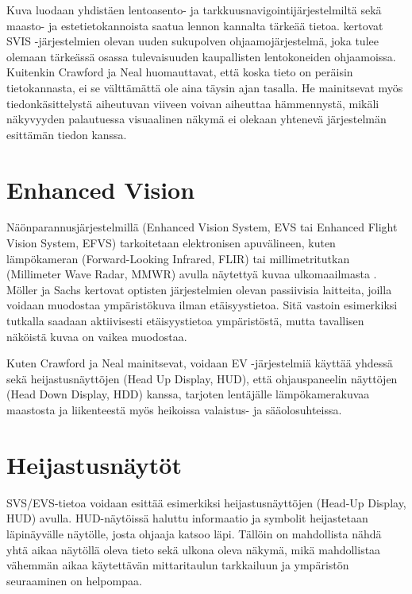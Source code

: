 \documentclass[utf8,bachelor,manualbib]{gradu3}
\begin{document}
Kuva luodaan yhdistäen lentoasento- ja tarkkuusnavigointijärjestelmiltä sekä maasto- ja estetietokannoista saatua lennon kannalta tärkeää tietoa. \cite{schnellym2004} kertovat SVIS -järjestelmien olevan uuden sukupolven ohjaamojärjestelmä, joka tulee olemaan tärkeässä osassa tulevaisuuden kaupallisten lentokoneiden ohjaamoissa. Kuitenkin Crawford ja Neal \citeyearpar{crawfordneal2006} huomauttavat, että koska tieto on peräisin tietokannasta, ei se välttämättä ole aina täysin ajan tasalla. He mainitsevat myös tiedonkäsittelystä aiheutuvan viiveen voivan aiheuttaa hämmennystä, mikäli näkyvyyden palautuessa visuaalinen näkymä ei olekaan yhtenevä järjestelmän esittämän tiedon kanssa.

\section{Enhanced Vision}

Näönparannusjärjestelmillä (Enhanced Vision System, EVS tai Enhanced Flight Vision System, EFVS) tarkoitetaan elektronisen apuvälineen, kuten lämpökameran (Forward-Looking Infrared, FLIR) tai millimetritutkan (Millimeter Wave Radar, MMWR) avulla näytettyä kuvaa ulkomaailmasta \citep{baileyym2007}. Möller ja Sachs \citeyearpar{mollersachs1994} kertovat optisten järjestelmien olevan passiivisia laitteita, joilla voidaan muodostaa ympäristökuva ilman etäisyystietoa. Sitä vastoin esimerkiksi tutkalla saadaan aktiivisesti etäisyystietoa ympäristöstä, mutta tavallisen näköistä kuvaa on vaikea muodostaa.

Kuten Crawford ja Neal \citeyearpar{crawfordneal2006} mainitsevat, voidaan EV -järjestelmiä käyttää yhdessä sekä heijastusnäyttöjen (Head Up Display, HUD), että ohjauspaneelin näyttöjen (Head Down Display, HDD) kanssa, tarjoten lentäjälle lämpökamerakuvaa maastosta ja liikenteestä myös heikoissa valaistus- ja sääolosuhteissa.

\section{Heijastusnäytöt}

SVS/EVS-tietoa voidaan esittää esimerkiksi heijastusnäyttöjen (Head-Up Display, HUD) avulla. HUD-näytöissä haluttu informaatio ja symbolit heijastetaan läpinäyvälle näytölle, josta ohjaaja katsoo läpi. Tällöin on mahdollista nähdä yhtä aikaa näytöllä oleva tieto sekä ulkona oleva näkymä, mikä mahdollistaa vähemmän aikaa käytettävän mittaritaulun tarkkailuun ja ympäristön seuraaminen on helpompaa. \citep{crawfordneal2006}
\end{document}
